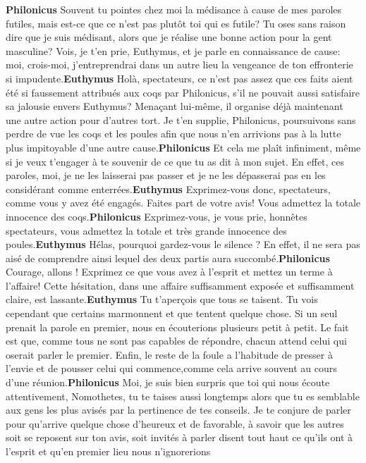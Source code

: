 \documentclass[12pt]{book}
\begin{document}
\begin{pages}
\begin{Rightside}
                    \pend\pstart\textbf{Philonicus }\hspace{1cm} Souvent tu pointes chez moi la médisance à cause de mes paroles futiles, mais est-ce que ce n'est pas plutôt toi qui es futile? Tu oses sans raison dire que je suis médisant, alors que je réalise une bonne action pour la gent masculine? Vois, je t’en prie, Euthymus, et je parle en connaissance de cause: moi, crois-moi, j'entreprendrai dans un autre lieu la vengeance de ton effronterie si impudente.\pend\pstart\textbf{Euthymus }\hspace{1cm} Holà, spectateurs, ce n'est pas assez que ces faits aient été si faussement attribués aux coqs par Philonicus, s'il ne pouvait aussi satisfaire sa jalousie envers Euthymus? Menaçant lui-même, il organise déjà maintenant une autre action pour d'autres tort. Je t’en supplie, Philonicus, poursuivons sans perdre de vue les coqs et les poules afin que nous n’en arrivions pas à la lutte plus impitoyable d’une autre cause.\pend\pstart\textbf{Philonicus }\hspace{1cm} Et cela me plaît infiniment, même si je veux t’engager à te souvenir de ce que tu as dit à mon sujet. En effet, ces paroles, moi, je ne les laisserai pas passer et je ne les dépasserai pas en les considérant comme enterrées.\pend\pstart\textbf{Euthymus }\hspace{1cm} Exprimez-vous donc, spectateurs, comme vous y avez été engagés. Faites part de votre avis! Vous admettez la totale innocence des coqs.\pend\pstart\textbf{Philonicus }\hspace{1cm} Exprimez-vous, je vous prie, honnêtes spectateurs, vous admettez la totale et très grande innocence des poules.\pend\pstart\textbf{Euthymus }\hspace{1cm} Hélas, pourquoi gardez-vous le silence ? En effet, il ne sera pas aisé de comprendre ainsi lequel des deux partis aura succombé.\pend\pstart\textbf{Philonicus }\hspace{1cm} Courage, allons ! Exprimez ce que vous avez à l'esprit et mettez un terme à l’affaire! Cette hésitation, dans une affaire suffisamment exposée et suffisamment claire, est lassante.\pend\pstart\textbf{Euthymus }\hspace{1cm} Tu t'aperçois que tous se taisent. Tu vois cependant que certains marmonnent et que tentent quelque chose. Si un seul prenait la parole en premier, nous en écouterions plusieurs petit à petit. Le fait est que, comme tous ne sont pas capables de répondre, chacun attend celui qui oserait parler le premier. Enfin, le reste de la foule a l'habitude de presser à l’envie et de pousser celui qui commence,comme cela arrive souvent au cours d'une réunion.\pend\pstart\textbf{Philonicus }\hspace{1cm} Moi, je suis bien surpris que toi qui nous écoute attentivement, Nomothetes, tu te taises aussi longtemps alors que tu es semblable aux gens les plus avisés par la pertinence de tes conseils. Je te conjure de parler pour qu’arrive quelque chose d’heureux et de favorable, à savoir que les autres soit se reposent sur ton avis, soit invités à parler disent tout haut ce qu’ils ont à l’esprit et qu’en premier lieu nous n’ignorerions 
\end{Rightside}
\end{pages}
\end{document}
